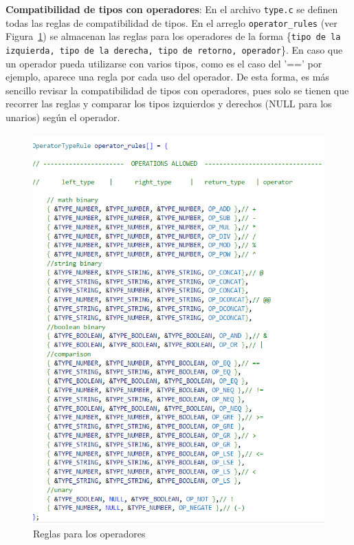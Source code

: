 \documentclass{llncs}
\begin{document}
\textbf{Compatibilidad de tipos con operadores}: En el archivo \texttt{type.c} se definen todas las reglas de compatibilidad de tipos. En el arreglo \texttt{operator\_rules} (ver Figura~\ref{fig:operadores}) se almacenan las reglas para los 
operadores de la forma \{\texttt{tipo de la izquierda, tipo de la derecha, tipo de retorno, operador}\}. En caso que un operador pueda utilizarse con varios tipos, como es el caso del '==' por ejemplo, aparece una regla por cada
uso del operador. De esta forma, es más sencillo revisar la compatibilidad de tipos con operadores, pues solo se tienen que recorrer las reglas y comparar los tipos izquierdos y derechos (NULL para los unarios) según el operador.

\begin{figure}
\centering
\includegraphics[width=1\textwidth]{images/op_rules.png}
\caption{Reglas para los operadores}
\label{fig:operadores}
\end{figure}
\end{document}
